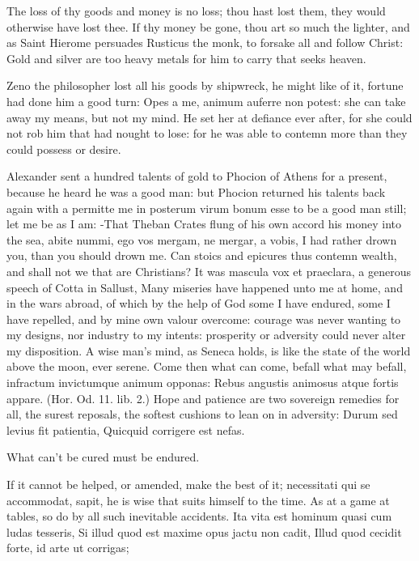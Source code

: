 {The loss of thy goods and money is no loss;  thou hast lost them,
they would otherwise have lost thee. If thy money be gone, thou
art so much the lighter, and as Saint Hierome persuades Rusticus the
monk, to forsake all and follow Christ: Gold and silver are too heavy
metals for him to carry that seeks heaven.

Zeno the philosopher lost all his goods by shipwreck, he might
like of it, fortune had done him a good turn: Opes a me, animum auferre
non potest: she can take away my means, but not my mind. He set her at
defiance ever after, for she could not rob him that had nought to lose:
for he was able to contemn more than they could possess or desire.

Alexander sent a hundred talents of gold to Phocion of Athens for a
present, because he heard he was a good man: but Phocion returned his
talents back again with a permitte me in posterum virum bonum esse to
be a good man still; let me be as I am: -That Theban Crates flung of his own accord his money into
the sea, abite nummi, ego vos mergam, ne mergar, a vobis, I had rather
drown you, than you should drown me. Can stoics and epicures thus
contemn wealth, and shall not we that are Christians? It was mascula
vox et praeclara, a generous speech of Cotta in Sallust, Many
miseries have happened unto me at home, and in the wars abroad, of
which by the help of God some I have endured, some I have repelled, and
by mine own valour overcome: courage was never wanting to my designs,
nor industry to my intents: prosperity or adversity could never alter
my disposition. A wise man's mind, as Seneca holds,  is like the
state of the world above the moon, ever serene. Come then what can
come, befall what may befall, infractum invictumque  animum
opponas: Rebus angustis animosus atque fortis appare. (Hor. Od. 11.
lib. 2.) Hope and patience are two sovereign remedies for all, the
surest reposals, the softest cushions to lean on in adversity:
Durum sed levius fit patientia,
Quicquid corrigere est nefas.

What can't be cured must be endured.

If it cannot be helped, or amended, make the best of it; 
necessitati qui se accommodat, sapit, he is wise that suits himself to
the time. As at a game at tables, so do by all such inevitable
accidents.
Ita vita est hominum quasi cum ludas tesseris,
Si illud quod est maxime opus jactu non cadit,
Illud quod cecidit forte, id arte ut corrigas;

}
